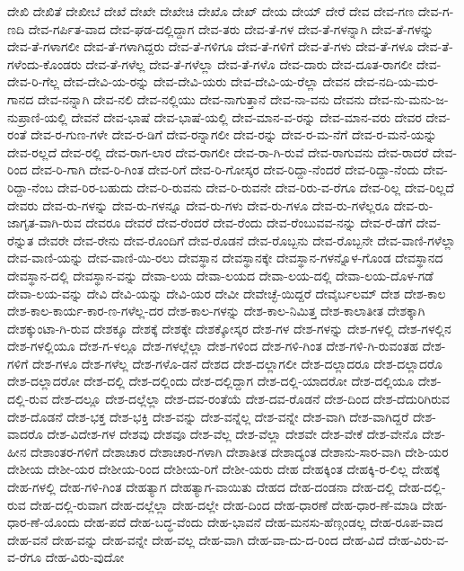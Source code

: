 {ದೇಖಿ
ದೇಖಿತೆ
ದೇಖೀಬೆ
ದೇಖೆ
ದೇಖೇ
ದೇಖೇಚಿ
ದೇಖೊ
ದೇಖ್
ದೇಯ
ದೇಯ್
ದೇರೆ
ದೇವ
ದೇವ-ಗಣ
ದೇವ-ಗ-ಣದಿ
ದೇವ-ಗರ್ಪಿತ-ವಾದ
ದೇವ-ಘಡ-ದಲ್ಲಿದ್ದಾಗ
ದೇವ-ತರು
ದೇವ-ತೆ-ಗಳ
ದೇವ-ತೆ-ಗಳನ್ನಾಗಿ
ದೇವ-ತೆ-ಗಳನ್ನು
ದೇವ-ತೆ-ಗಳಾಗಲೀ
ದೇವ-ತೆ-ಗಳಾಗಿದ್ದರು
ದೇವ-ತೆ-ಗಳಿಗೂ
ದೇವ-ತೆ-ಗಳಿಗೆ
ದೇವ-ತೆ-ಗಳು
ದೇವ-ತೆ-ಗಳೂ
ದೇವ-ತೆ-ಗಳೆಂದು-ಕೊಂಡರು
ದೇವ-ತೆ-ಗಳೆಲ್ಲ
ದೇವ-ತೆ-ಗಳೆಲ್ಲಾ
ದೇವ-ತೆ-ಗಳೊ
ದೇವ-ದಾರು
ದೇವ-ದೂತ-ರಾಗಲೀ
ದೇವ-ದೇವ-ರಿ-ಗೆಲ್ಲ
ದೇವ-ದೇವಿ-ಯ-ರನ್ನು
ದೇವ-ದೇವಿ-ಯರು
ದೇವ-ದೇವಿ-ಯ-ರೆಲ್ಲಾ
ದೇವನ
ದೇವ-ನದಿ-ಯ-ಮರ-ಗಾನದ
ದೇವ-ನನ್ನಾಗಿ
ದೇವ-ನಲಿ
ದೇವ-ನಲ್ಲಿಯು
ದೇವ-ನಾಗುತ್ತಾನೆ
ದೇವ-ನಾ-ವನು
ದೇವನು
ದೇವ-ನು-ಮನು-ಜ-ನುಪ್ರಾಣಿ-ಯಲ್ಲಿ
ದೇವನೆ
ದೇವ-ಭಾಷೆ
ದೇವ-ಭಾಷೆ-ಯಲ್ಲಿ
ದೇವ-ಮಾನ-ವ-ರನ್ನು
ದೇವ-ಮಾನ-ವರು
ದೇವರ
ದೇವ-ರಂತೆ
ದೇವ-ರ-ಗುಣ-ಗಳೇ
ದೇವ-ರ-ಡಿಗೆ
ದೇವ-ರನ್ನಾಗಲೀ
ದೇವ-ರನ್ನು
ದೇವ-ರ-ಮ-ನೆಗೆ
ದೇವ-ರ-ಮನೆ-ಯನ್ನು
ದೇವ-ರಲ್ಲದೆ
ದೇವ-ರಲ್ಲಿ
ದೇವ-ರಾಗ-ಲಾರ
ದೇವ-ರಾಗಲೀ
ದೇವ-ರಾ-ಗಿ-ರುವೆ
ದೇವ-ರಾಗುವನು
ದೇವ-ರಾದರೆ
ದೇವ-ರಿಂದ
ದೇವ-ರಿ-ಗಾಗಿ
ದೇವ-ರಿ-ಗಿಂತ
ದೇವ-ರಿಗೆ
ದೇವ-ರಿ-ಗೋಸ್ಕರ
ದೇವ-ರಿದ್ದಾ-ನೆಂದರೆ
ದೇವ-ರಿದ್ದಾ-ನೆಂದು
ದೇವ-ರಿದ್ದಾ-ನೆಂಬ
ದೇವ-ರಿರ-ಬಹುದು
ದೇವ-ರಿ-ರುವನು
ದೇವ-ರಿ-ರುವನೇ
ದೇವ-ರಿರು-ವ-ರೆಗೂ
ದೇವ-ರಿಲ್ಲ
ದೇವ-ರಿಲ್ಲದೆ
ದೇವರು
ದೇವ-ರು-ಗಳನ್ನು
ದೇವ-ರು-ಗಳನ್ನೂ
ದೇವ-ರು-ಗಳು
ದೇವ-ರು-ಗಳೂ
ದೇವ-ರು-ಗಳೆಲ್ಲರೂ
ದೇವ-ರು-ಜಾಗೃತ-ವಾಗಿ-ರುವ
ದೇವರೂ
ದೇವರೆ
ದೇವ-ರೆಂದರೆ
ದೇವ-ರೆಂದು
ದೇವ-ರೆಂಬುವವ-ನನ್ನು
ದೇವ-ರೆ-ಡೆಗೆ
ದೇವ-ರೆನ್ನುತ
ದೇವರೇ
ದೇವ-ರೇನು
ದೇವ-ರೊಂದಿಗೆ
ದೇವ-ರೊಡನೆ
ದೇವ-ರೊಬ್ಬನು
ದೇವ-ರೊಬ್ಬನೇ
ದೇವ-ವಾಣಿ-ಗಳೆಲ್ಲಾ
ದೇವ-ವಾಣಿ-ಯನ್ನು
ದೇವ-ವಾಣಿ-ಯಿ-ರಲು
ದೇವಸ್ಥಾನ
ದೇವಸ್ಥಾನಕ್ಕೇ
ದೇವಸ್ಥಾನ-ಗಳನ್ನೊಳ-ಗೊಂಡ
ದೇವಸ್ಥಾನದ
ದೇವಸ್ಥಾನ-ದಲ್ಲಿ
ದೇವಸ್ಥಾನ-ವನ್ನು
ದೇವಾ-ಲಯ
ದೇವಾ-ಲಯದ
ದೇವಾ-ಲಯ-ದಲ್ಲಿ
ದೇವಾ-ಲಯ-ದೊಳ-ಗಡೆ
ದೇವಾ-ಲಯ-ವನ್ನು
ದೇವಿ
ದೇವಿ-ಯನ್ನು
ದೇವಿ-ಯರ
ದೇವೀ
ದೇವೇಚ್ಛೆ-ಯಿದ್ದರೆ
ದೇವೈರ್ಬಲಮ್
ದೇಶ
ದೇಶ-ಕಾಲ
ದೇಶ-ಕಾಲ-ಕಾರ್ಯ-ಕಾರ-ಣ-ಗಳೆಲ್ಲ-ದರ
ದೇಶ-ಕಾಲ-ಗಳನ್ನು
ದೇಶ-ಕಾಲ-ನಿಮಿತ್ತ
ದೇಶ-ಕಾಲಾತೀತ
ದೇಶಕ್ಕಾಗಿ
ದೇಶಕ್ಕುಂಟಾ-ಗಿ-ರುವ
ದೇಶಕ್ಕೂ
ದೇಶಕ್ಕೆ
ದೇಶಕ್ಕೇ
ದೇಶಕ್ಕೋಸ್ಕರ
ದೇಶ-ಗಳ
ದೇಶ-ಗಳನ್ನು
ದೇಶ-ಗಳಲ್ಲಿ
ದೇಶ-ಗಳಲ್ಲಿನ
ದೇಶ-ಗಳಲ್ಲಿಯೂ
ದೇಶ-ಗ-ಳಲ್ಲೂ
ದೇಶ-ಗಳಲ್ಲೆಲ್ಲಾ
ದೇಶ-ಗಳಿಂದ
ದೇಶ-ಗಳಿ-ಗಿಂತ
ದೇಶ-ಗಳಿ-ಗಿ-ರುವಂತಹ
ದೇಶ-ಗಳಿಗೆ
ದೇಶ-ಗಳೂ
ದೇಶ-ಗಳೆಲ್ಲ
ದೇಶ-ಗಳೊ-ಡನೆ
ದೇಶದ
ದೇಶ-ದಲ್ಲಾಗಲೀ
ದೇಶ-ದಲ್ಲಾದರೂ
ದೇಶ-ದಲ್ಲಾದರೊ
ದೇಶ-ದಲ್ಲಾದರೋ
ದೇಶ-ದಲ್ಲಿ
ದೇಶ-ದಲ್ಲಿಂದು
ದೇಶ-ದಲ್ಲಿದ್ದಾಗ
ದೇಶ-ದಲ್ಲಿ-ಯಾದರೋ
ದೇಶ-ದಲ್ಲಿಯೂ
ದೇಶ-ದಲ್ಲಿ-ರುವ
ದೇಶ-ದಲ್ಲೂ
ದೇಶ-ದಲ್ಲೆಲ್ಲಾ
ದೇಶ-ದವ-ರಂತೆಯೆ
ದೇಶ-ದವ-ರೊಡನೆ
ದೇಶ-ದಿಂದ
ದೇಶ-ದೆದುರಿಗಿರುವ
ದೇಶ-ದೊಡನೆ
ದೇಶ-ಭಕ್ತ
ದೇಶ-ಭಕ್ತಿ
ದೇಶ-ವನ್ನು
ದೇಶ-ವನ್ನೆಲ್ಲ
ದೇಶ-ವನ್ನೇ
ದೇಶ-ವಾಗಿ
ದೇಶ-ವಾಗಿದ್ದರೆ
ದೇಶ-ವಾದರೊ
ದೇಶ-ವಿದೇಶ-ಗಳ
ದೇಶವು
ದೇಶವೂ
ದೇಶ-ವೆಲ್ಲ
ದೇಶ-ವೆಲ್ಲಾ
ದೇಶವೇ
ದೇಶ-ವೇಕೆ
ದೇಶ-ವೇನೊ
ದೇಶ-ಹೀನ
ದೇಶಾಂತರ-ಗಳಿಗೆ
ದೇಶಾಚಾರ
ದೇಶಾಚಾರ-ಗಳಾಗಿ
ದೇಶಾತೀತ
ದೇಶಾದ್ಯಂತ
ದೇಶಾನು-ಸಾರ-ವಾಗಿ
ದೇಶಿ-ಯರ
ದೇಶೀಯ
ದೇಶೀ-ಯರ
ದೇಶೀಯ-ರಿಂದ
ದೇಶೀಯ-ರಿಗೆ
ದೇಶೀ-ಯರು
ದೇಹ
ದೇಹಕ್ಕಿಂತ
ದೇಹಕ್ಕಿ-ರ-ಲಿಲ್ಲ
ದೇಹಕ್ಕೆ
ದೇಹ-ಗಳಲ್ಲಿ
ದೇಹ-ಗಳಿ-ಗಿಂತ
ದೇಹತ್ಯಾಗ
ದೇಹತ್ಯಾಗ-ವಾಯಿತು
ದೇಹದ
ದೇಹ-ದಂಡನಾ
ದೇಹ-ದಲ್ಲಿ
ದೇಹ-ದಲ್ಲಿ-ರುವ
ದೇಹ-ದಲ್ಲಿ-ರುವಾಗ
ದೇಹ-ದಲ್ಲೆಲ್ಲಾ
ದೇಹ-ದಲ್ಲೇ
ದೇಹ-ದಿಂದ
ದೇಹ-ಧಾರಣೆ
ದೇಹ-ಧಾರ-ಣೆ-ಮಾಡಿ
ದೇಹ-ಧಾರ-ಣೆ-ಯೊಂದು
ದೇಹ-ಪದೆ
ದೇಹ-ಬದ್ಧ-ವೆಂದು
ದೇಹ-ಭಾವನೆ
ದೇಹ-ಮನಸು-ಹೆಣ್ಗಂಡಲ್ಲ
ದೇಹ-ರೂಪ-ವಾದ
ದೇಹ-ವನೆ
ದೇಹ-ವನ್ನು
ದೇಹ-ವನ್ನೇ
ದೇಹ-ವಲ್ಲ
ದೇಹ-ವಾಗಿ
ದೇಹ-ವಾ-ದು-ದ-ರಿಂದ
ದೇಹ-ವಿದೆ
ದೇಹ-ವಿರು-ವ-ವ-ರೆಗೂ
ದೇಹ-ವಿರು-ವುದೋ
}
